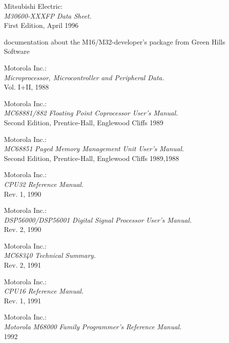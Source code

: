 \documentclass[12pt,twoside]{report}
\begin{document}
\begin{thebibliography}{99}
 Mitsubishi Electric: \\
                   {\em M30600-XXXFP Data Sheet.\/} \\
                   First Edition, April 1996

 documentation about the M16/M32-developer's package
                   from Green Hills Software

 Motorola Inc.: \\
                 {\em Microprocessor, Microcontroller and Peripheral
                 Data.\/} \\
		 Vol. I+II, 1988

 Motorola Inc.: \\
                {\em MC68881/882 Floating Point Coprocessor User's
                Manual.\/} \\
                Second Edition, Prentice-Hall, Englewood Cliffs 1989

 Motorola Inc.: \\
                {\em MC68851 Paged Memory Management Unit User's
                Manual.\/} \\
                Second Edition, Prentice-Hall, Englewood Cliffs 1989,1988

 Motorola Inc.: \\
                {\em CPU32 Reference Manual.\/} \\
                Rev. 1, 1990

 Motorola Inc.: \\
                {\em DSP56000/DSP56001 Digital Signal Processor User's
                Manual.\/} \\
                Rev. 2, 1990

 Motorola Inc.: \\
                 {\em MC68340 Technical Summary.\/} \\
                 Rev. 2, 1991

 Motorola Inc.: \\
                {\em CPU16 Reference Manual.\/} \\
                Rev. 1, 1991

 Motorola Inc.: \\
                 {\em Motorola M68000 Family Programmer's
                  Reference Manual.\/} \\
                 1992


\end{thebibliography}
\end{document}
